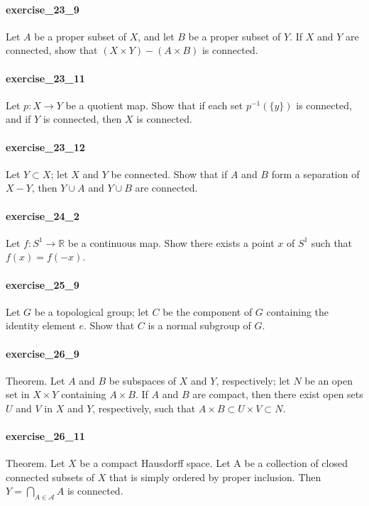\documentclass{article}
\begin{document}
\paragraph{exercise\_23\_9} Let $A$ be a proper subset of $X$, and let $B$ be a proper subset of $Y$. If $X$ and $Y$ are connected, show that $(X \times Y)-(A \times B)$ is connected.

\paragraph{exercise\_23\_11} Let $p: X \rightarrow Y$ be a quotient map. Show that if each set $p^{-1}(\{y\})$ is connected, and if $Y$ is connected, then $X$ is connected.

\paragraph{exercise\_23\_12} Let $Y \subset X$; let $X$ and $Y$ be connected. Show that if $A$ and $B$ form a separation of $X-Y$, then $Y \cup A$ and $Y \cup B$ are connected.

\paragraph{exercise\_24\_2} Let $f: S^{1} \rightarrow \mathbb{R}$ be a continuous map. Show there exists a point $x$ of $S^{1}$ such that $f(x)=f(-x)$.

\paragraph{exercise\_25\_9} Let $G$ be a topological group; let $C$ be the component of $G$ containing the identity element $e$. Show that $C$ is a normal subgroup of $G$.

\paragraph{exercise\_26\_9} Theorem. Let $A$ and $B$ be subspaces of $X$ and $Y$, respectively; let $N$ be an open set in $X \times Y$ containing $A \times B$. If $A$ and $B$ are compact, then there exist open sets $U$ and $V$ in $X$ and $Y$, respectively, such that $A \times B \subset U \times V \subset N .$

\paragraph{exercise\_26\_11} Theorem. Let $X$ be a compact Hausdorff space. Let A be a collection of closed connected subsets of $X$ that is simply ordered by proper inclusion. Then $Y=\bigcap_{A \in \mathcal{A}} A$ is connected.
\end{document}
